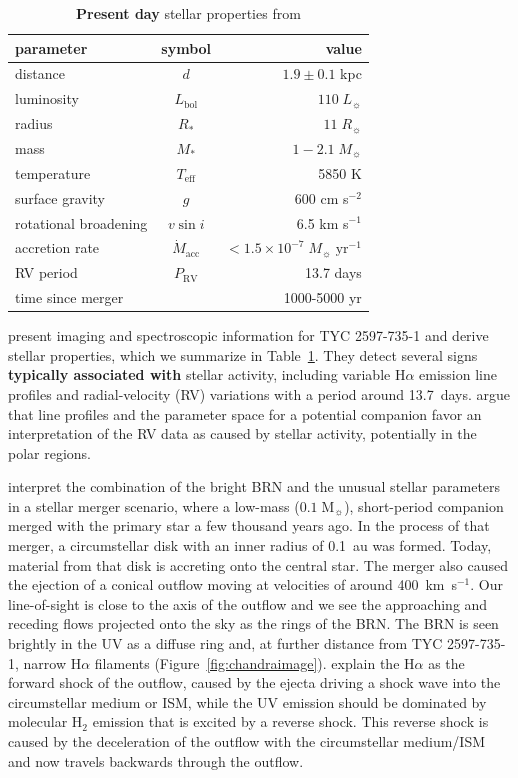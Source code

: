 \documentclass[linenumbers]{aastex631}
\begin{document}
\begin{table}
\caption{\textbf{Present day} stellar properties from \citet{2020Natur.587..387H} \label{tab:parameters}}
\begin{tabular}{lcr}
\hline \hline
parameter & symbol & value \\
\hline
distance & $d$ & $1.9 \pm 0.1$ kpc\\
luminosity & $L_\mathrm{bol}$ & $110 \;L_\sun{}$\\
radius & $R_*$ & $11\;R_\sun{}$\\
mass & $M_*$ & $1-2.1\;M_\sun{}$\\
temperature & $T_\mathrm{eff}$ & 5850 K\\
surface gravity & $g$ & 600 cm s$^{-2}$\\
rotational broadening & $v \sin i$ & 6.5 km s$^{-1}$\\
accretion rate & $\dot M_\mathrm{acc}$ & $<1.5 \times 10^{-7}\; M_\sun{}\;\mathrm{yr}^{-1}$\\
RV period & $P_\mathrm{RV}$ & 13.7 days \\
time since merger & & 1000-5000 yr\\
\hline
\end{tabular}
\end{table}

\cite{2020Natur.587..387H} present imaging and spectroscopic information for TYC 2597-735-1 and derive stellar properties, which we summarize in Table~\ref{tab:parameters}. They detect several signs \textbf{typically associated with} stellar activity, including variable H$\alpha$ emission line profiles and radial-velocity (RV)  variations with a period around 13.7~days. \cite{2020Natur.587..387H} argue that line profiles and the parameter space for a potential companion favor an interpretation of the RV data as caused by stellar activity, potentially in the polar regions.

\cite{2020Natur.587..387H} interpret the combination of the bright BRN and the unusual stellar parameters in a stellar merger scenario, where a low-mass ($0.1\;\mathrm{M}_\sun$), short-period companion merged with the primary star a few thousand years ago. In the process of that merger, a circumstellar disk with an inner radius of 0.1~au was formed. Today, material from that disk is accreting onto the central star. The merger also caused the ejection of a conical outflow moving at velocities of around 400~km~s$^{-1}$. Our line-of-sight is close to the axis of the outflow and we see the approaching and receding flows projected onto the sky as the rings of the BRN.
The BRN is seen brightly in the UV as a diffuse ring and, at further distance from TYC 2597-735-1, narrow H$\alpha$ filaments (Figure~\ref{fig:chandraimage}). \cite{2020Natur.587..387H} explain the H$\alpha$ as the forward shock of the outflow, caused by the ejecta driving a shock wave into the circumstellar medium or ISM, while the UV emission should be dominated by molecular H$_2$ emission that is excited by a reverse shock. This reverse shock is caused by the deceleration of the outflow with the circumstellar medium/ISM and now travels backwards through the outflow.
\end{document}
